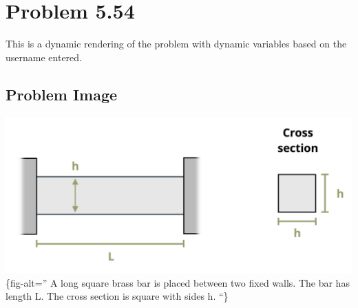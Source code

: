 \documentclass[
  letterpaper,
  DIV=11,
  numbers=noendperiod]{scrreprt}
\begin{document}
\chapter*{Problem 5.54}\label{problem-5.54}


This is a dynamic rendering of the problem with dynamic variables based
on the username entered.

\section*{Problem Image}\label{problem-image-57}


\includegraphics{images/226.png}\{fig-alt='' A long square brass bar is
placed between two fixed walls. The bar has length L. The cross section
is square with sides h. ``\}
\end{document}
